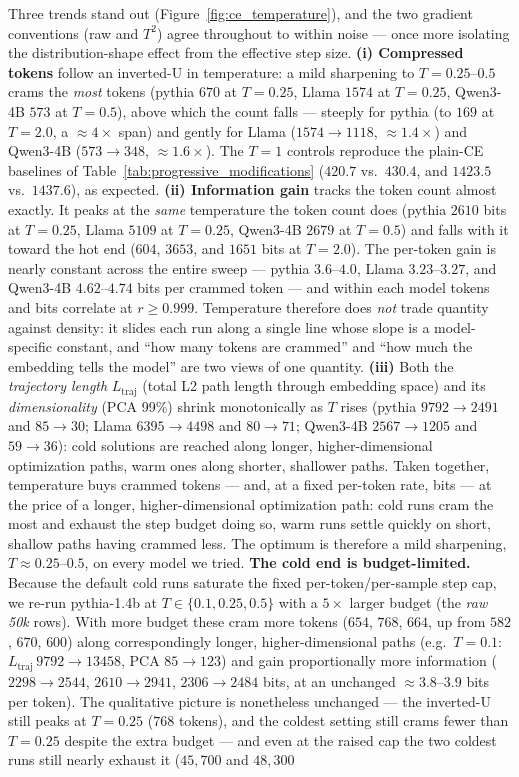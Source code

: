 Three trends stand out (Figure~\ref{fig:ce_temperature}), and the two gradient conventions (raw and $T^2$) agree throughout to within noise --- once more isolating the distribution-shape effect from the effective step size. \textbf{(i) Compressed tokens} follow an inverted-U in temperature: a mild sharpening to $T{=}0.25$--$0.5$ crams the \emph{most} tokens (pythia $670$ at $T{=}0.25$, Llama $1574$ at $T{=}0.25$, Qwen3-4B $573$ at $T{=}0.5$), above which the count falls --- steeply for pythia (to $169$ at $T{=}2.0$, a ${\approx}4\times$ span) and gently for Llama ($1574 \to 1118$, ${\approx}1.4\times$) and Qwen3-4B ($573 \to 348$, ${\approx}1.6\times$). The $T{=}1$ controls reproduce the plain-CE baselines of Table~\ref{tab:progressive_modifications} ($420.7$ vs.\ $430.4$, and $1423.5$ vs.\ $1437.6$), as expected. \textbf{(ii) Information gain} tracks the token count almost exactly. It peaks at the \emph{same} temperature the token count does (pythia $2610$ bits at $T{=}0.25$, Llama $5109$ at $T{=}0.25$, Qwen3-4B $2679$ at $T{=}0.5$) and falls with it toward the hot end ($604$, $3653$, and $1651$ bits at $T{=}2.0$). The per-token gain is nearly constant across the entire sweep --- pythia $3.6$--$4.0$, Llama $3.23$--$3.27$, and Qwen3-4B $4.62$--$4.74$ bits per crammed token --- and within each model tokens and bits correlate at $r \ge 0.999$. Temperature therefore does \emph{not} trade quantity against density: it slides each run along a single line whose slope is a model-specific constant, and ``how many tokens are crammed'' and ``how much the embedding tells the model'' are two views of one quantity. \textbf{(iii)} Both the \emph{trajectory length} $L_{\text{traj}}$ (total L2 path length through embedding space) and its \emph{dimensionality} (PCA 99\%) shrink monotonically as $T$ rises (pythia $9792 \to 2491$ and $85 \to 30$; Llama $6395 \to 4498$ and $80 \to 71$; Qwen3-4B $2567 \to 1205$ and $59 \to 36$): cold solutions are reached along longer, higher-dimensional optimization paths, warm ones along shorter, shallower paths. Taken together, temperature buys crammed tokens --- and, at a fixed per-token rate, bits --- at the price of a longer, higher-dimensional optimization path: cold runs cram the most and exhaust the step budget doing so, warm runs settle quickly on short, shallow paths having crammed less. The optimum is therefore a mild sharpening, $T{\approx}0.25$--$0.5$, on every model we tried. \textbf{The cold end is budget-limited.} Because the default cold runs saturate the fixed per-token/per-sample step cap, we re-run pythia-1.4b at $T\in\{0.1,0.25,0.5\}$ with a $5\times$ larger budget (the \emph{raw 50k} rows). With more budget these cram more tokens ($654$, $768$, $664$, up from $582$, $670$, $600$) along correspondingly longer, higher-dimensional paths (e.g.\ $T{=}0.1$: $L_{\text{traj}}\,9792\to 13458$, PCA $85\to 123$) and gain proportionally more information ($2298\to 2544$, $2610\to 2941$, $2306\to 2484$ bits, at an unchanged ${\approx}3.8$--$3.9$ bits per token). The qualitative picture is nonetheless unchanged --- the inverted-U still peaks at $T{=}0.25$ ($768$ tokens), and the coldest setting still crams fewer than $T{=}0.25$ despite the extra budget --- and even at the raised cap the two coldest runs still nearly exhaust it ($45{,}700$ and $48{,}300$ 